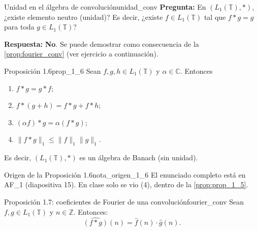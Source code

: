 \begin{observacion}{Unidad en el álgebra de convolución}{unidad_conv}
\textbf{Pregunta:} En $(L_1(\mathbb{T}), *)$, ¿existe elemento neutro (unidad)? Es decir, ¿existe $f \in L_1(\mathbb{T})$ tal que $f * g = g$ para toda $g \in L_1(\mathbb{T})$?

\textbf{Respuesta:} \textbf{No}. Se puede demostrar como consecuencia de la \cref{prop:fourier_conv} (ver ejercicio a continuación).
\end{observacion}

\begin{proposicion}{Proposición 1.6}{prop_1_6}
Sean $f, g, h \in L_1(\mathbb{T})$ y $\alpha \in \mathbb{C}$. Entonces
\begin{enumerate}
\item[(1)] $f * g = g * f$;
\item[(2)] $f * (g + h) = f * g + f * h$;
\item[(3)] $(\alpha f) * g = \alpha(f * g)$;
\item[(4)] $\|f * g\|_1 \le \|f\|_1\|g\|_1$.
\end{enumerate}
Es decir, $(L_1(\mathbb{T}), *)$ es un álgebra de Banach (sin unidad).
\end{proposicion}

\begin{nota}{Origen de la Proposición 1.6}{nota_origen_1_6}
El enunciado completo está en AF\_1 (diapositiva 15). En clase solo se vio (4), dentro de la \cref{prop:prop_1_5}.
\end{nota}

\begin{proposicion}{Proposición 1.7: coeficientes de Fourier de una convolución}{fourier_conv}
Sean $f, g \in L_1(\mathbb{T})$ y $n \in \mathbb{Z}$. Entonces:
\[
\widehat{(f * g)}(n) = \hat{f}(n) \cdot \hat{g}(n).
\]
\end{proposicion}

